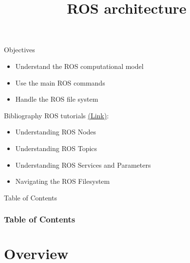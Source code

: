 \documentclass[10pt,compress]{beamer} %
\title[ROS architecture]{ROS architecture}
\author{}
\institute{\asignatura}
\date{}
\begin{document}
{\titlepageBlue
    \begin{frame}
        \titlepage
    \end{frame}
}

\begin{frame}[plain]{}
   \begin{block}{Objectives}
       \begin{itemize}
        \item Understand the ROS computational model
        \item Use the main ROS commands
	\item Handle the ROS file system
       \end{itemize}
   \end{block}

   \begin{block}{Bibliography}
       ROS tutorials \href{http://wiki.ros.org/ROS/Tutorials}{(Link)}: 
	\begin{itemize}
	\item Understanding ROS Nodes
	\item Understanding ROS Topics
	\item Understanding ROS Services and Parameters
	\item Navigating the ROS Filesystem
	\end{itemize}
   \end{block}

\end{frame}

{
\begin{frame}[shrink]{Table of Contents}
 \frametitle{Table of Contents}
 \tableofcontents
\end{frame}
}

\section{Overview}
\end{document}
